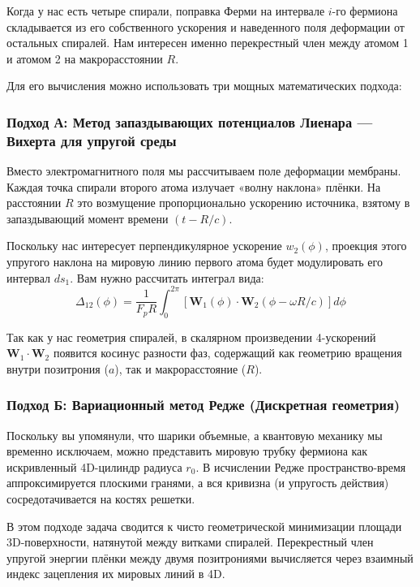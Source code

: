 \documentclass[12pt,a4paper]{article}
\begin{document}
Когда у нас есть четыре спирали, поправка Ферми на интервале $i$-го фермиона складывается из его собственного ускорения и наведенного поля деформации от остальных спиралей. Нам интересен именно перекрестный член между атомом 1 и атомом 2 на макрорасстоянии $R$.

Для его вычисления можно использовать три мощных математических подхода:

\subsubsection*{Подход А: Метод запаздывающих потенциалов Лиенара — Вихерта для упругой среды}

Вместо электромагнитного поля мы рассчитываем поле деформации мембраны. Каждая точка спирали второго атома излучает «волну наклона» плёнки. На расстоянии $R$ это возмущение пропорционально ускорению источника, взятому в запаздывающий момент времени $(t - R/c)$.

Поскольку нас интересует перпендикулярное ускорение $w_2(\phi)$, проекция этого упругого наклона на мировую линию первого атома будет модулировать его интервал $ds_1$. Вам нужно рассчитать интеграл вида:
\begin{equation}
\Delta_{12}(\phi) = \frac{1}{F_p R} \int_0^{2\pi} \left[ \mathbf{W}_1(\phi) \cdot \mathbf{W}_2(\phi - \omega R/c) \right] d\phi
\end{equation}

Так как у нас геометрия спиралей, в скалярном произведении 4-ускорений $\mathbf{W}_1 \cdot \mathbf{W}_2$ появится косинус разности фаз, содержащий как геометрию вращения внутри позитрония ($a$), так и макрорасстояние ($R$).

\subsubsection*{Подход Б: Вариационный метод Редже (Дискретная геометрия)}

Поскольку вы упомянули, что шарики объемные, а квантовую механику мы временно исключаем, можно представить мировую трубку фермиона как искривленный 4D-цилиндр радиуса $r_0$. В исчислении Редже пространство-время аппроксимируется плоскими гранями, а вся кривизна (и упругость действия) сосредотачивается на костях решетки.

В этом подходе задача сводится к чисто геометрической минимизации площади 3D-поверхности, натянутой между витками спиралей. Перекрестный член упругой энергии плёнки между двумя позитрониями вычисляется через взаимный индекс зацепления их мировых линий в 4D.
\end{document}
